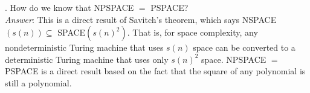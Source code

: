 \documentclass{scrartcl}
\begin{document}
    \bigskip
    . How do we know that \textsf{NPSPACE $=$ PSPACE}?\\

    \noindent
    \textit{Answer}: This is a direct result of Savitch's theorem, which says \textsf{NSPACE$(s(n))
    \subseteq$ SPACE$(s(n)^2)$}. That is, for space complexity, any nondeterministic Turing machine
    that uses $s(n)$ space can be converted to a deterministic Turing machine that uses only
    $s(n)^2$ space. \textsf{NPSPACE $=$ PSPACE} is a direct result based on the fact that the square
    of any polynomial is still a polynomial.\\
\end{document}
